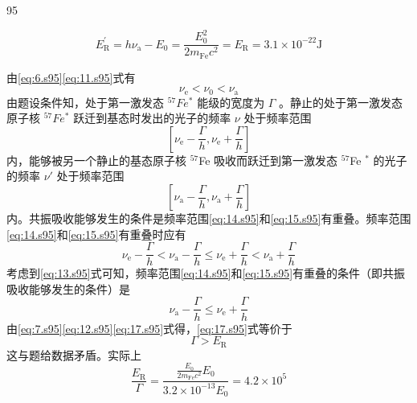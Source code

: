 \begin{solution}{95}
\begin{subsolution}
\begin{equation}
E _ {\mathrm{R}} ^ {\prime} = h \nu_ {\mathrm{a}} - E _ {0} = \frac {E _ {0} ^ {2}}{2 m _ {\mathrm{Fe}} c ^ {2}} = E _ {\mathrm{R}} = 3. 1 \times 1 0 ^ {- 2 2} \mathrm{J}
\label{eq:12.s95}
\end{equation}
\end{subsolution}
\begin{subsolution}
由\eqref{eq:6.s95}\eqref{eq:11.s95}式有
\begin{equation}
\nu_ {\mathrm{e}} <   \nu_ {0} <   \nu_ {\mathrm{a}}
\label{eq:13.s95}
\end{equation}
由题设条件知，处于第一激发态 $^{57}Fe^{*}$ 能级的宽度为 $\Gamma$ 。静止的处于第一激发态原子核 $^{57}Fe^{*}$ 跃迁到基态时发出的光子的频率 $\nu$ 处于频率范围
\begin{equation}
\left[ \nu_ {\mathrm{e}} - \frac {\Gamma}{h}, \nu_ {\mathrm{e}} + \frac {\Gamma}{h} \right]
\label{eq:14.s95}
\end{equation}
内，能够被另一个静止的基态原子核 $^{57}$Fe 吸收而跃迁到第一激发态 $^{57}$Fe $^{*}$ 的光子的频率 $\nu'$ 处于频率范围
\begin{equation}
\left[ \nu_ {\mathrm{a}} - \frac {\Gamma}{h}, \nu_ {\mathrm{a}} + \frac {\Gamma}{h} \right]
\label{eq:15.s95}
\end{equation}
内。共振吸收能够发生的条件是频率范围\eqref{eq:14.s95}和\eqref{eq:15.s95}有重叠。频率范围\eqref{eq:14.s95}和\eqref{eq:15.s95}有重叠时应有
\begin{equation}
\nu_ {\mathrm{e}} - \frac {\Gamma}{h} <   \nu_ {\mathrm{a}} - \frac {\Gamma}{h} \leq \nu_ {\mathrm{e}} + \frac {\Gamma}{h} <   \nu_ {\mathrm{a}} + \frac {\Gamma}{h}
\label{eq:16.s95}
\end{equation}
考虑到\eqref{eq:13.s95}式可知，频率范围\eqref{eq:14.s95}和\eqref{eq:15.s95}有重叠的条件（即共振吸收能够发生的条件）是
\begin{equation}
\nu_ {\mathrm{a}} - \frac {\Gamma}{h} \leq \nu_ {\mathrm{e}} + \frac {\Gamma}{h}
\label{eq:17.s95}
\end{equation}
由\eqref{eq:7.s95}\eqref{eq:12.s95}\eqref{eq:17.s95}式得，\eqref{eq:17.s95}式等价于
\begin{equation}
\Gamma > E _ {\mathrm{R}}
\label{eq:18.s95}
\end{equation}
这与题给数据矛盾。实际上
\begin{equation}
\frac {E _ {\mathrm{R}}}{\Gamma} = \frac {\frac {E _ {0}}{2 m _ {\mathrm{Fe}} c ^ {2}} E _ {0}}{3 . 2 \times 1 0 ^ {- 1 3} E _ {0}} = 4. 2 \times 1 0 ^ {5}
\label{eq:19.s95}
\end{equation}

\end{subsolution}
\end{solution}
